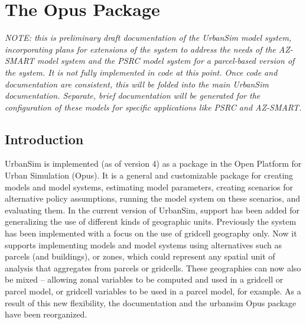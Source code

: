 
\chapter{The  Opus Package}

\emph{NOTE: this is preliminary draft documentation of the UrbanSim model system, incorporating
plans for extensions of the system to address the needs of the AZ-SMART model system and 
the PSRC model system for a parcel-based version of the system.  It is not fully implemented in 
code at this point.  Once code and
documentation are consistent, this will be folded into the main UrbanSim documentation.  Separate, 
brief documentation will be generated for the configuration of these models for specific
applications like PSRC and AZ-SMART.}

\section{Introduction}

UrbanSim is implemented (as of version 4) as a package in the Open Platform for Urban Simulation (Opus).
It is a general and customizable package for creating models and model systems, estimating model
parameters, creating scenarios for alternative policy assumptions, running the model system on these
scenarios, and evaluating them.  In the current version of UrbanSim, support has been added for 
generalizing the use of different kinds of geographic units.  Previously the system has been implemented
with a focus on the use of gridcell geography only.  Now it supports implementing models and model
systems using alternatives such as parcels (and buildings), or zones, which could represent any spatial
unit of analysis that aggregates from parcels or gridcells.  These geographies can now also be mixed -- 
allowing zonal variables to be computed and used in a gridcell or parcel model, or gridcell variables to be
used in a parcel model, for example.  As a result of this new flexibility, the documentation and the urbansim 
Opus package have been reorganized.

